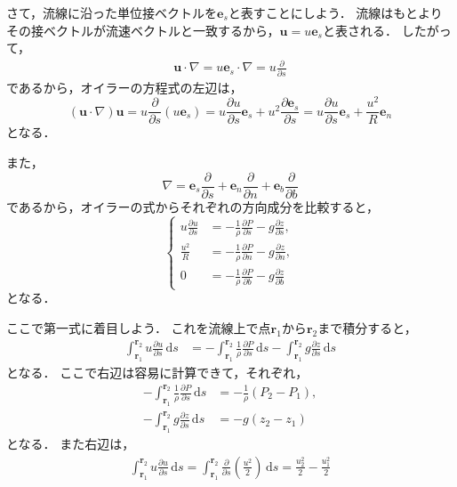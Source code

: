 \documentclass[uplatex,dvipdfmx,a4j,11pt]{jsreport}
\newcommand{\e}{\mathbf{e}} %
\newcommand{\diff}{\mathrm{d}} %
\numberwithin{equation}{chapter}
\begin{document}
さて，流線に沿った単位接ベクトルを$\e_s$と表すことにしよう．
流線はもとよりその接ベクトルが流速ベクトルと一致するから，$\mathbf{u} = u\e_s$と表される．
したがって，
\begin{gather*}
  \mathbf{u}\cdot \nabla = u \e_s \cdot \nabla = u \frac{\partial }{\partial s}
\end{gather*}
であるから，オイラーの方程式の左辺は，
\begin{equation}
  (\mathbf{u}\cdot \nabla)\mathbf{u} = u \frac{\partial }{\partial s}(u \e_s) = u \frac{\partial u}{\partial s} \e_s + u^2 \frac{\partial \e_s}{\partial s} = u \frac{\partial u}{\partial s} \e_s + \frac{u^2}{R} \e_n
\end{equation}
となる．

また，
\begin{equation}
  \nabla = \e_s \frac{\partial}{\partial s} + \e_n \frac{\partial}{\partial n} + \e_b \frac{\partial}{\partial b}
\end{equation}
であるから，オイラーの式からそれぞれの方向成分を比較すると，
\begin{equation}
  \left\{ 
  \begin{alignedat}{2} 
    \displaystyle u \frac{\partial u}{\partial s} &= -\frac{1}{\rho} \frac{\partial P}{\partial s} - g \frac{\partial z}{\partial s},\\
    \displaystyle \frac{u^2}{R} &= -\frac{1}{\rho} \frac{\partial P}{\partial n} - g \frac{\partial z}{\partial n},\\ 
    \displaystyle 0 &= -\frac{1}{\rho} \frac{\partial P}{\partial b} - g \frac{\partial z}{\partial b}
  \end{alignedat}
  \right.
\end{equation}
となる．

ここで第一式に着目しよう．
これを流線上で点$\mathbf{r}_1$から$\mathbf{r}_2$まで積分すると，
\begin{align*}
  \int_{\mathbf{r}_1}^{\mathbf{r}_2} u \frac{\partial u}{\partial s} \, \diff s &= -\int_{\mathbf{r}_1}^{\mathbf{r}_2} \frac{1}{\rho} \frac{\partial P}{\partial s} \, \diff s - \int_{\mathbf{r}_1}^{\mathbf{r}_2} g \frac{\partial z}{\partial s} \,\diff s
\end{align*}
となる．
ここで右辺は容易に計算できて，それぞれ，
\begin{align*}
  -\int_{\mathbf{r}_1}^{\mathbf{r}_2} \frac{1}{\rho} \frac{\partial P}{\partial s} \, \diff s &= -\frac{1}{\rho}(P_2 - P_1),\\
  -\int_{\mathbf{r}_1}^{\mathbf{r}_2} g \frac{\partial z}{\partial s} \,\diff s &= -g(z_2 - z_1)
\end{align*}
となる．
また右辺は，
\begin{align*}
  \int_{\mathbf{r}_1}^{\mathbf{r}_2} u \frac{\partial u}{\partial s} \, \diff s 
  = \int_{\mathbf{r}_1}^{\mathbf{r}_2} \frac{\partial}{\partial s}\left(\frac{u^2}{2}\right) \, \diff s
  = \frac{u_2^2}{2} - \frac{u_1^2}{2}
\end{align*}
\end{document}
